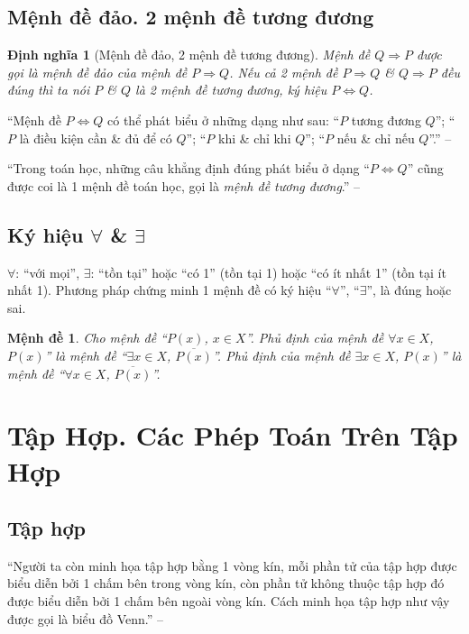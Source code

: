 \documentclass[oneside]{book}
\numberwithin{equation}{section}
\newtheorem{dinhnghia}{Định nghĩa}[section]
\newtheorem{menhde}{Mệnh đề}[section]
\begin{document}
\subsection{Mệnh đề đảo. 2 mệnh đề tương đương}

\begin{dinhnghia}[Mệnh đề đảo, 2 mệnh đề tương đương]
	Mệnh đề $Q\Rightarrow P$ được gọi là \emph{mệnh đề đảo} của mệnh đề $P\Rightarrow Q$. Nếu cả 2 mệnh đề $P\Rightarrow Q$ \& $Q\Rightarrow P$ đều đúng thì ta nói $P$ \& $Q$ là \emph{2 mệnh đề tương đương}, ký hiệu $P\Leftrightarrow Q$.
\end{dinhnghia}
``Mệnh đề $P\Leftrightarrow Q$ có thể phát biểu ở những dạng như sau: ``$P$ tương đương $Q$''; ``$P$ là điều kiện cần \& đủ để có $Q$''; ``$P$ khi \& chỉ khi $Q$''; ``$P$ nếu \& chỉ nếu $Q$''.'' -- \cite[p. 8]{SGK_Toan_10_Canh_Dieu_tap_1}

``Trong toán học, những câu khẳng định đúng phát biểu ở dạng ``$P\Leftrightarrow Q$'' cũng được coi là 1 mệnh đề toán học, gọi là \textit{mệnh đề tương đương}.'' -- \cite[p. 9]{SGK_Toan_10_Canh_Dieu_tap_1}

\subsection{Ký hiệu $\forall$ \& $\exists$}
$\forall$: ``với mọi'', $\exists$: ``tồn tại'' hoặc ``có 1'' (tồn tại 1) hoặc ``có ít nhất 1'' (tồn tại ít nhất 1). Phương pháp chứng minh 1 mệnh đề có ký hiệu ``$\forall$'', ``$\exists$'', là đúng hoặc sai.

\begin{menhde}
	Cho mệnh đề ``$P(x)$, $x\in X$''. Phủ định của mệnh đề $\forall x\in X$, $P(x)$'' là mệnh đề ``$\exists x\in X$, $\overline{P(x)}$''. Phủ định của mệnh đề $\exists x\in X$, $P(x)$'' là mệnh đề ``$\forall x\in X$, $\overline{P(x)}$''.
\end{menhde}

\section{Tập Hợp. Các Phép Toán Trên Tập Hợp}

\subsection{Tập hợp}
``Người ta còn minh họa tập hợp bằng 1 vòng kín, mỗi phần tử của tập hợp được biểu diễn bởi 1 chấm bên trong vòng kín, còn phần tử không thuộc tập hợp đó được biểu diễn bởi 1 chấm bên ngoài vòng kín. Cách minh họa tập hợp như vậy được gọi là biểu đồ Venn.'' -- \cite[p. 12]{SGK_Toan_10_Canh_Dieu_tap_1}
\end{document}
